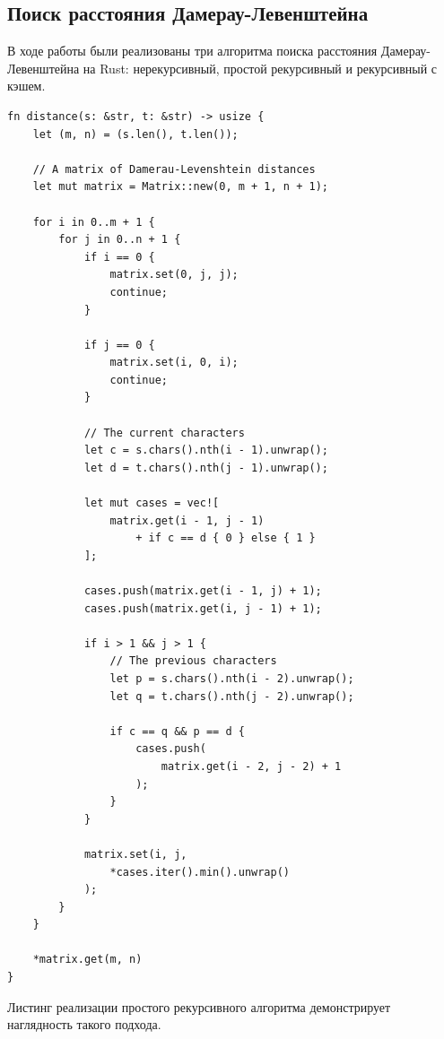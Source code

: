 \documentclass{report}
\begin{document}
\subsection{Поиск расстояния Дамерау-Левенштейна}

В ходе работы были реализованы три алгоритма поиска расстояния
Дамерау-Левенштейна на Rust: нерекурсивный, простой рекурсивный и
рекурсивный с кэшем.

\begin{lstlisting}[caption=Реализация нерекурсивного алгоритма
    поиска $\Delta_{\textup{ДЛ}}$]
fn distance(s: &str, t: &str) -> usize {
    let (m, n) = (s.len(), t.len());

    // A matrix of Damerau-Levenshtein distances
    let mut matrix = Matrix::new(0, m + 1, n + 1);

    for i in 0..m + 1 {
        for j in 0..n + 1 {
            if i == 0 {
                matrix.set(0, j, j);
                continue;
            }

            if j == 0 {
                matrix.set(i, 0, i);
                continue;
            }

            // The current characters
            let c = s.chars().nth(i - 1).unwrap();
            let d = t.chars().nth(j - 1).unwrap();

            let mut cases = vec![
                matrix.get(i - 1, j - 1)
                    + if c == d { 0 } else { 1 }
            ];

            cases.push(matrix.get(i - 1, j) + 1);
            cases.push(matrix.get(i, j - 1) + 1);

            if i > 1 && j > 1 {
                // The previous characters
                let p = s.chars().nth(i - 2).unwrap();
                let q = t.chars().nth(j - 2).unwrap();

                if c == q && p == d {
                    cases.push(
                        matrix.get(i - 2, j - 2) + 1
                    );
                }
            }

            matrix.set(i, j,
                *cases.iter().min().unwrap()
            );
        }
    }

    *matrix.get(m, n)
}
\end{lstlisting}

Листинг реализации простого рекурсивного алгоритма демонстрирует
наглядность такого подхода.
\end{document}
